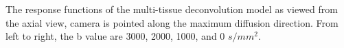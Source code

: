 \label{fig:responseZView} The response functions of the multi-tissue deconvolution model as viewed from the axial view, camera is pointed along the maximum diffusion direction. From left to right, the b value are 3000, 2000, 1000, and 0 $s/mm^2$.